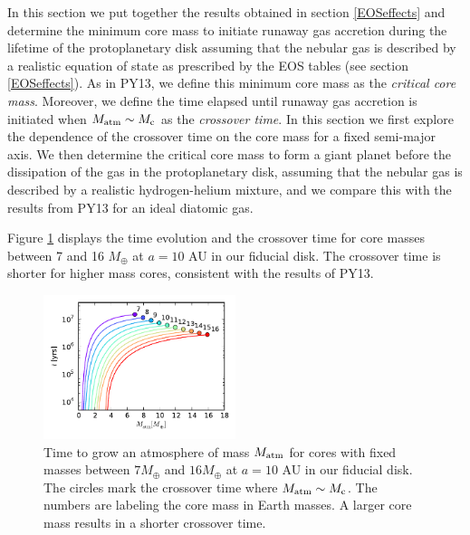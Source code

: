 \documentclass[apj]{emulateapj}
\newcommand{\co}{_{\rm c}}
\begin{document}


In this section we put together the results obtained in section \ref{EOSeffects} and determine the minimum core mass to initiate runaway gas accretion during the lifetime of the protoplanetary disk assuming that the nebular gas is described by a realistic equation of state as prescribed by the \citet{saumon95} EOS tables (see section \ref{EOSeffects}). As in PY13, we define this minimum core mass as the \textit{critical core mass}. Moreover, we define the time elapsed until runaway gas accretion is initiated when $M_{\rm{atm}} \sim M\co$ as the \textit{crossover time}. In this section we first explore the dependence of the crossover time on the core mass for a fixed semi-major axis. We then determine the critical core mass to form a giant planet before the dissipation of the gas in the protoplanetary disk, assuming that the nebular gas is described by a realistic hydrogen-helium mixture, and we compare this with the results from PY13 for an ideal diatomic gas. 



Figure \ref{fig:tvsMplot} displays the time evolution and the crossover time for core masses between 7 and 16 $M_{\oplus}$ at $a=10$ AU in our fiducial disk. The crossover time is shorter for higher mass cores, consistent with the results of PY13. 

\begin{figure}[h!]
\centering
\includegraphics[width=0.5\textwidth]{../../figs/ModelAtmospheres/RadSelfGravRealEOS/t_vs_M_10au.pdf}
\caption{Time to grow an atmosphere of mass $M_{\rm{atm}}$ for cores with fixed masses between $7 M_{\oplus}$ and $16 M_{\oplus}$ at $a=10$ AU in our fiducial disk. The circles mark the crossover time where $M_{\rm{atm}} \sim M_{\rm c}$. The numbers are labeling the core mass in Earth masses. A larger core mass results in a shorter crossover time.}
\label{fig:tvsMplot}
\end{figure}
\end{document}
